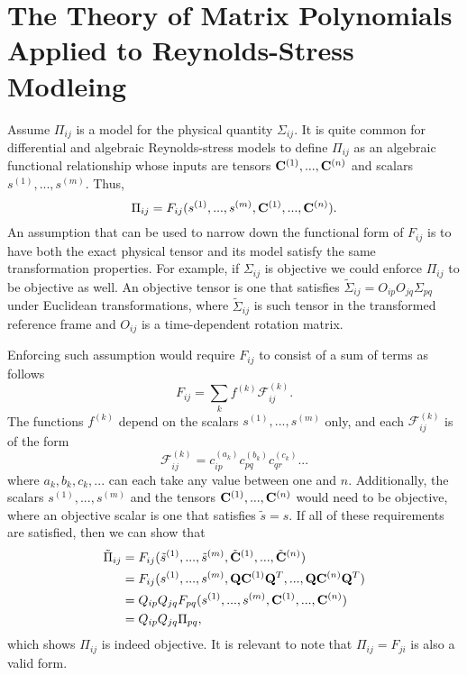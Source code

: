 \documentclass[oneside,a4paper,11pt]{report}
\begin{document}
\section{The Theory of Matrix Polynomials Applied to Reynolds-Stress Modleing}

\label{sec:polynomial_expansions}
Assume $\Pi_{ij}$ is a model for the physical quantity $\Sigma_{ij}$. It is quite common for differential and algebraic Reynolds-stress models to define $\Pi_{ij}$ as an algebraic functional relationship whose inputs are tensors $\bold{C}^{(1)},...,\bold{C}^{(n)}$ and scalars $s^{(1)},...,s^{(m)}$. Thus,
\begin{equation}
\Pi_{ij} = F_{ij}(s^{(1)}, ..., s^{(m)},\bold{C}^{(1)}, ..., \bold{C}^{(n)}).
\end{equation}
An assumption that can be used to narrow down the functional form of $F_{ij}$ is to have both the exact physical tensor and its model satisfy the same transformation properties. For example, if $\Sigma_{ij}$ is objective we could enforce $\Pi_{ij}$ to be objective as well. An objective tensor is one that satisfies $\tilde{\Sigma}_{ij} = O_{ip}O_{jq}\Sigma_{pq}$ under Euclidean transformations, where $\tilde{\Sigma}_{ij}$ is such tensor in the transformed reference frame and $O_{ij}$ is a time-dependent rotation matrix.

Enforcing such assumption would require $F_{ij}$ to consist of a sum of terms as follows
\begin{equation}
\label{poly_expan}
F_{ij} = \sum_{k} f^{(k)}\mathcal{F}_{ij}^{(k)}.
\end{equation}
The functions $f^{(k)}$ depend on the scalars $s^{(1)}, ...,s^{(m)}$ only, and each $\mathcal{F}_{ij}^{(k)}$ is of the form
\begin{equation}
\label{tensor_product}
\mathcal{F}_{ij}^{(k)} = c^{(a_k)}_{ip}c^{(b_k)}_{pq}c^{(c_k)}_{qr}...
\end{equation}
where $a_k,b_k,c_k,...$ can each take any value between one and $n$. Additionally, the scalars $s^{(1)},...,s^{(m)}$ and the tensors $\bold{C}^{(1)},...,\bold{C}^{(n)}$ would need to be objective, where an objective scalar is one that satisfies $\tilde{s} = s$. If all of these requirements are satisfied, then we can show that
\begin{align}
\tilde{\Pi}_{ij} & = F_{ij}(\tilde{s}^{(1)}, ..., \tilde{s}^{(m)},\tilde{\bold{C}}^{(1)}, ..., \tilde{\bold{C}}^{(n)}) \nonumber \\
& = F_{ij}(s^{(1)}, ..., s^{(m)},\bold{Q} \bold{C}^{(1)}\bold{Q}^T, ..., \bold{Q} \bold{C}^{(n)}\bold{Q}^T) \nonumber \\
& = Q_{ip}Q_{jq} F_{pq}(s^{(1)}, ..., s^{(m)}, \bold{C}^{(1)}, ..., \bold{C}^{(n)}) \nonumber \\
&= Q_{ip}Q_{jq} \Pi_{pq}, 
\end{align}
which shows $\Pi_{ij}$ is indeed objective. It is relevant to note that $\Pi_{ij} = F_{ji}$ is also a valid form.
\end{document}
